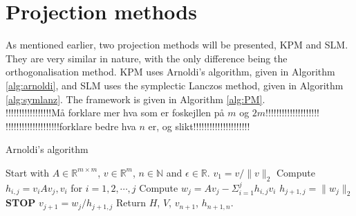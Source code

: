 \section{Projection methods}
As mentioned earlier, two projection methods will be presented, KPM and SLM. They are very similar in nature, with the only difference being the orthogonalisation method. KPM uses Arnoldi's algorithm, given in Algorithm \ref{alg:arnoldi}, and SLM uses the symplectic Lanczos method, given in Algorithm \ref{alg:symlanz}. The framework is given in Algorithm \ref{alg:PM}. \\
!!!!!!!!!!!!!!!!!Må forklare mer hva som er foskejllen på $m$ og $2m$!!!!!!!!!!!!!!!!!!!!\\
!!!!!!!!!!!!!!!!!!!!forklare bedre hva $n$ er, og slikt!!!!!!!!!!!!!!!!!!!!!\\
\begin{algorithm} 
\begin{algorithmic} \caption{Arnoldi's algorithm\cite{arnold}} \label{alg:arnoldi}  
\STATE Start with $A \in \mathbb{R}^{m \times m}$, $v \in \mathbb{R}^{m}$, $n \in \mathbb{N}$ and $\epsilon \in \mathbb{R}$.
\STATE $v_1 = v/\|v \|_2$
   \STATE Compute $h_{i,j} =  v_iAv_j,v_i $ for $i = 1,2,\cdots, j$
    \STATE Compute $w_j = A v_j - \Sigma_{i=1}^{j} h_{i,j}v_i $
    \STATE $h_{j+1,j} = \| w_j \|_2$
        \STATE\textbf{STOP}
    \ENDIF 
   \STATE $v_{j+1} = w_j/h_{j+1,j}$
\ENDFOR
\STATE Return $H$, $V$, $v_{n+1}$, $h_{n+1,n}$.
\end{algorithmic} 
\end{algorithm}

